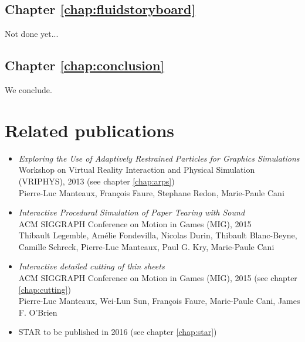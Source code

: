 \subsection*{Chapter \ref{chap:fluidstoryboard}}
Not done yet...\\

\subsection*{Chapter \ref{chap:conclusion}}
We conclude.

\section{Related publications}
\begin{itemize}
    \item \cite{Manteaux2013} \emph{Exploring the Use of Adaptively Restrained Particles for Graphics Simulations} \\
    Workshop on Virtual Reality Interaction and Physical Simulation (VRIPHYS), 2013 (see chapter \ref{chap:arps})\\
    Pierre-Luc Manteaux, François Faure, Stephane Redon, Marie-Paule Cani
    \item \cite{Lejemble2015} \emph{Interactive Procedural Simulation of Paper Tearing with Sound} \\
    ACM SIGGRAPH Conference on Motion in Games (MIG), 2015 \\
    Thibault Legemble, Amélie Fondevilla, Nicolas Durin, Thibault Blanc-Beyne, Camille Schreck, Pierre-Luc Manteaux, Paul G. Kry, Marie-Paule Cani
    \item \cite{Manteaux2015} \emph{Interactive detailed cutting of thin sheets} \\
        ACM SIGGRAPH Conference on Motion in Games (MIG), 2015 (see chapter \ref{chap:cutting})\\
        Pierre-Luc Manteaux, Wei-Lun Sun, François Faure, Marie-Paule Cani, James F. O'Brien
	\item STAR to be published in 2016 (see chapter \ref{chap:star})
\end{itemize}
